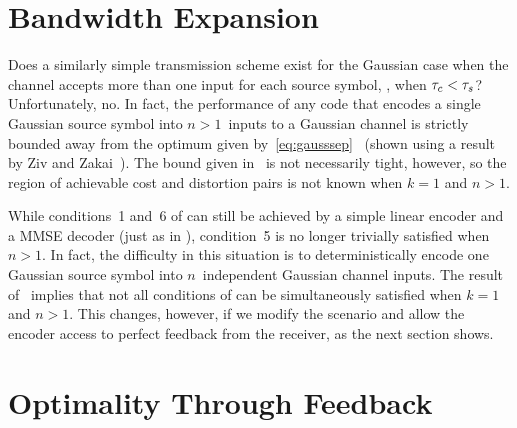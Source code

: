 \section{Bandwidth Expansion}\label{sec:gaussbwex}

Does a similarly simple transmission scheme exist for the Gaussian case when the
channel accepts more than one input for each source symbol, \ie, when ${\tau_c} <
{\tau_s}$?  Unfortunately, no. In fact, the performance of any code that encodes a
single Gaussian source symbol into $n>1$~inputs to a Gaussian channel is
strictly bounded away from the optimum given
by~\eqref{eq:gausssep}~\cite{IngberLZF2008} (shown using a result by Ziv and
Zakai~\cite{ZivZ1973}).  The bound given in~\cite{IngberLZF2008} is not
necessarily tight, however, so the region of achievable cost and distortion
pairs is not known when $k = 1$ and $n > 1$. 

While conditions~1 and~6 of  can still be achieved
by a simple linear encoder and a MMSE decoder (just as in ),
condition~5 is no longer trivially satisfied when $n > 1$. In fact, the
difficulty in this situation is to deterministically encode one Gaussian source
symbol into $n$~independent Gaussian channel inputs. The result
of~\cite{IngberLZF2008} implies that not all conditions of
 can be simultaneously satisfied when $k = 1$ and
$n > 1$.  This changes, however, if we modify the scenario and allow the encoder
access to perfect feedback from the receiver, as the next section shows.

%


\section{Optimality Through Feedback}\label{sec:gaussfeedback}


